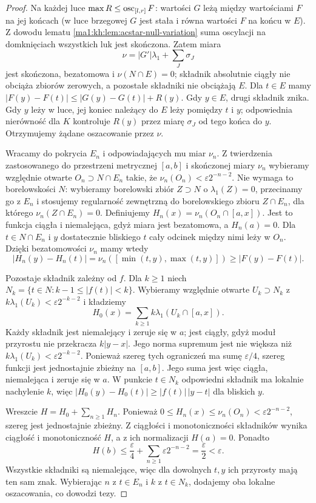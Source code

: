 \begin{proof}
Na każdej luce $\max R\le\operatorname{osc}_{[l,r]}F$: wartości $G$ leżą
między wartościami $F$ na jej końcach (w luce brzegowej
$G$ jest stała i równa wartości $F$ na końcu w $E$).
Z dowodu lematu \ref{ma1:kh:lem:acstar-null-variation} suma
oscylacji na domknięciach wszystkich luk jest skończona.
Zatem miara
\[
 \nu=|G'|\lambda_1+\sum_J\sigma_J
\]
jest skończona, bezatomowa i $\nu(N\cap E)=0$; składnik
absolutnie ciągły nie obciąża zbiorów zerowych, a pozostałe
składniki nie obciążają $E$. Dla $t\in E$ mamy
$|F(y)-F(t)|\le |G(y)-G(t)|+R(y)$. Gdy $y\in E$,
drugi składnik znika. Gdy $y$ leży w luce, jej koniec
należący do $E$ leży pomiędzy $t$ i $y$; odpowiednia
nierówność dla $K$ kontroluje $R(y)$ przez miarę
$\sigma_J$ od tego końca do $y$. Otrzymujemy żądane
oszacowanie przez $\nu$.

Wracamy do pokrycia $E_n$ i odpowiadających mu miar $\nu_n$.
Z twierdzenia
zastosowanego do przestrzeni metrycznej $[a,b]$
i skończonej miary $\nu_n$ wybieramy względnie
otwarte $O_n\supset N\cap E_n$ takie, że
$\nu_n(O_n)<\varepsilon2^{-n-2}$. Nie wymaga to borelowskości $N$: wybieramy borelowski
zbiór $Z\supset N$ o $\lambda_1(Z)=0$, przecinamy go
z $E_n$ i stosujemy regularność zewnętrzną do
borelowskiego zbioru $Z\cap E_n$, dla którego
$\nu_n(Z\cap E_n)=0$.
Definiujemy $H_n(x)=\nu_n(O_n\cap[a,x])$.
Jest to funkcja ciągła i niemalejąca, gdyż miara jest
bezatomowa, a $H_n(a)=0$. Dla $t\in N\cap E_n$ i $y$
dostatecznie bliskiego $t$ cały odcinek między nimi leży
w $O_n$. Dzięki bezatomowości $\nu_n$ mamy wtedy
\[
 |H_n(y)-H_n(t)|
 =\nu_n([\min(t,y),\max(t,y)])
 \ge |F(y)-F(t)|.
\]

Pozostaje składnik zależny od $f$. Dla $k\ge1$ niech
$N_k=\{t\in N:k-1\le |f(t)|<k\}$. Wybieramy względnie
otwarte $U_k\supset N_k$ z
$k\lambda_1(U_k)<\varepsilon2^{-k-2}$ i kładziemy
\[
 H_0(x)=\sum_{k\ge1} k\lambda_1(U_k\cap[a,x]).
\]
Każdy składnik jest niemalejący i zeruje się w $a$;
jest ciągły, gdyż moduł przyrostu nie przekracza
$k|y-x|$. Jego norma supremum jest nie większa niż
$k\lambda_1(U_k)<\varepsilon2^{-k-2}$.
Ponieważ szereg tych ograniczeń ma sumę $\varepsilon/4$,
szereg funkcji jest jednostajnie zbieżny na $[a,b]$.
Jego suma jest więc ciągła, niemalejąca i zeruje się w $a$. W punkcie $t\in N_k$ odpowiedni
składnik ma lokalnie nachylenie $k$, więc
$|H_0(y)-H_0(t)|\ge |f(t)|\,|y-t|$ dla bliskich $y$.

Wreszcie $H=H_0+\sum_{n\ge1}H_n$. Ponieważ
$0\le H_n(x)\le\nu_n(O_n)<\varepsilon2^{-n-2}$,
szereg jest jednostajnie zbieżny. Z ciągłości i monotoniczności
składników wynika ciągłość i monotoniczność $H$, a z ich
normalizacji $H(a)=0$. Ponadto
\[
 H(b)\le\frac{\varepsilon}{4}
       +\sum_{n\ge1}\varepsilon2^{-n-2}
       =\frac{\varepsilon}{2}<\varepsilon.
\]
Wszystkie składniki są niemalejące, więc dla dowolnych
$t,y$ ich przyrosty mają ten sam znak. Wybierając $n$
z $t\in E_n$ i $k$ z $t\in N_k$, dodajemy oba lokalne
oszacowania, co dowodzi tezy.
\end{proof}

